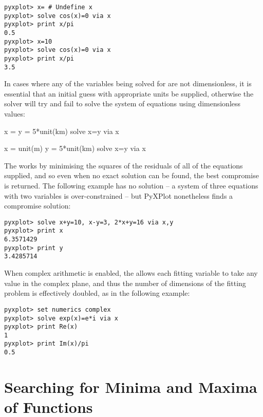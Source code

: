\begin{verbatim}
pyxplot> x= # Undefine x
pyxplot> solve cos(x)=0 via x
pyxplot> print x/pi
0.5
pyxplot> x=10
pyxplot> solve cos(x)=0 via x
pyxplot> print x/pi
3.5
\end{verbatim}

\noindent In cases where any of the variables being solved for are not
dimensionless, it is essential that an initial guess with appropriate units be
supplied, otherwise the solver will try and fail to solve the system of
equations using dimensionless values:

\begin{dontdo}
x =\newline
y = 5*unit(km)\newline
solve x=y via x
\end{dontdo}

\begin{dodo}
x = unit(m)\newline
y = 5*unit(km)\newline
solve x=y via x
\end{dodo}

The  works by minimising the squares of the residuals of all of the
equations supplied, and so even when no exact solution can be found, the best
compromise is returned. The following example has no solution -- a system of
three equations with two variables is over-constrained -- but PyXPlot
nonetheless finds a compromise solution:

\begin{verbatim}
pyxplot> solve x+y=10, x-y=3, 2*x+y=16 via x,y
pyxplot> print x
6.3571429
pyxplot> print y
3.4285714
\end{verbatim}

When complex arithmetic is enabled, the  allows each fitting
variable to take any value in the complex plane, and thus the number of
dimensions of the fitting problem is effectively doubled, as in the following
example:

\begin{verbatim}
pyxplot> set numerics complex
pyxplot> solve exp(x)=e*i via x
pyxplot> print Re(x)
1
pyxplot> print Im(x)/pi
0.5
\end{verbatim}

\section{Searching for Minima and Maxima of Functions}

